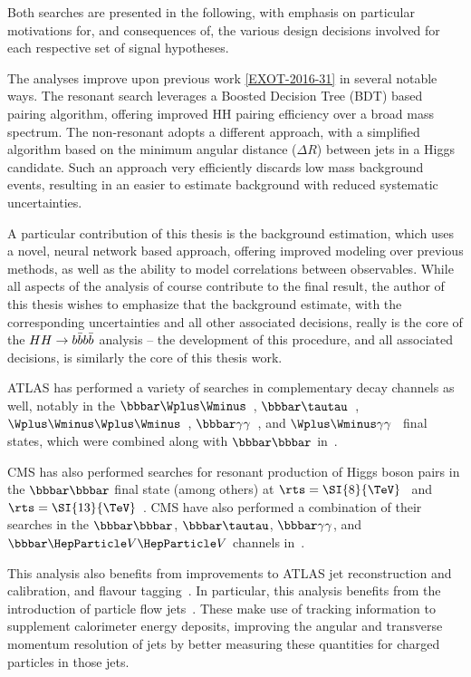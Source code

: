 Both searches are presented in the following, with emphasis on particular motivations for, and consequences
of, the various design decisions involved for each respective set of signal hypotheses. 

The analyses improve upon previous work \ref{EXOT-2016-31} in several notable ways. The resonant search leverages 
a Boosted Decision Tree (BDT) based pairing algorithm, offering improved HH pairing efficiency over a broad 
mass spectrum. The non-resonant adopts a different approach, with a simplified algorithm based on the minimum
angular distance ($\Delta R$) between jets in a Higgs candidate. Such an approach very efficiently discards 
low mass background events, resulting in an easier to estimate background with reduced systematic uncertainties.

A particular contribution of this thesis is the background estimation, which uses a novel, neural network
based approach, offering improved modeling over previous methods, as well as the ability to model correlations 
between observables. While all aspects of the analysis of course contribute to the final result, the author of this 
thesis wishes to emphasize that the background estimate, with the corresponding uncertainties and all 
other associated decisions, really is the core of the $HH\rightarrow b\bar{b}b\bar{b}$ analysis -- the development
of this procedure, and all associated decisions, is similarly the core of this thesis work.

ATLAS has performed a variety of searches in complementary decay channels as well,
notably in the $\bbbar\Wplus\Wminus$~\cite{HIGG-2016-27},
$\bbbar\tautau$~\cite{HIGG-2016-16},
$\Wplus\Wminus\Wplus\Wminus$~\cite{HIGG-2016-24},
$\bbbar\gamma\gamma$~\cite{HIGG-2016-15}, and
$\Wplus\Wminus\gamma\gamma$~\cite{HIGG-2016-20} final states, which were combined
along with $\bbbar\bbbar$ in~\cite{HDBS-2018-58}.

CMS has also performed searches for resonant production of Higgs boson pairs in
the $\bbbar\bbbar$ final state (among others) at
$\rts = \SI{8}{\TeV}$~\cite{CMS-EXO-12-053} and
$\rts = \SI{13}{\TeV}$~\cite{CMS-B2G-17-019}. CMS have also performed a
combination of their searches in the $\bbbar\bbbar$, $\bbbar\tautau$,
$\bbbar\gamma\gamma$, and $\bbbar\VVbos$ channels in~\cite{CMS-HIG-17-030}.

This analysis also benefits from improvements to ATLAS jet reconstruction and
calibration, and flavour tagging~\cite{FTAG-2018-01}. In particular, this
analysis benefits from the introduction of particle flow
jets~\cite{PERF-2015-09}. These make use of tracking information to supplement
calorimeter energy deposits, improving the angular and transverse momentum
resolution of jets by better measuring these quantities for charged particles in
those jets.

